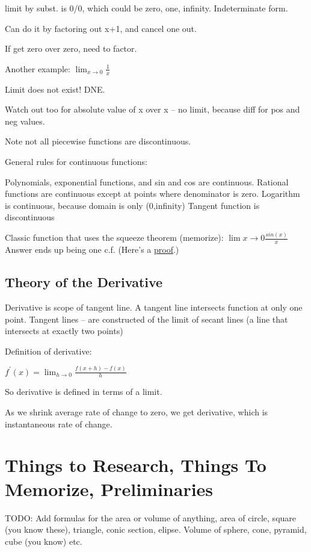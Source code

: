 \documentclass[12pt, letterpaper]{article}
\begin{document}
limit by subst. is 0/0, which could be zero, one, infinity.  Indeterminate form.

Can do it by factoring out x+1, and cancel one out.

If get zero over zero, need to factor.

\vspace{5mm}

Another example: \(
    \lim_{x \to 0}\frac{1}{x}
\)

\vspace{5mm}
Limit does not exist!  DNE.

Watch out too for absolute value of x over x -- no limit, because diff for pos and neg values.

Note not all piecewise functions are discontinuous.

General rules for continuous functions:

Polynomials, exponential functions, and sin and cos are continuous.
Rational functions are continuous except at points where denominator is zero.
Logarithm is continuous, because domain is only (0,infinity)
Tangent function is discontinuous

\vspace{1cm}
Classic function that uses the squeeze theorem (memorize):
\(\lim{x \to 0}\frac{sin(x)}{x}\)
Answer ends up being one c.f. (Here's a \href{http://ime.math.arizona.edu/g-teams/Profiles/JS/Calc/SqueezeTheorem.pdf}{proof}.)

\subsection{Theory of the Derivative}
Derivative is scope of tangent line.
A tangent line intersects function at only one point.
Tangent lines -- are constructed of the limit of secant lines (a line that intersects at exactly two points)
\vspace{.5cm}

Definition of derivative:

\vspace{.5cm}

$f^\prime{(x)} = \lim_{h \to 0} \frac{f(x + h) - f(x)}{h}   $


So derivative is defined in terms of a limit.

As we shrink average rate of change to zero, we get derivative, which is instantaneous rate of change.

\section{Things to Research, Things To Memorize, Preliminaries}
TODO:  Add formulas for the area or volume of anything, area of circle, square (you know these), triangle, conic section, elipse. Volume of sphere, cone, pyramid, cube (you know) etc.
\end{document}
